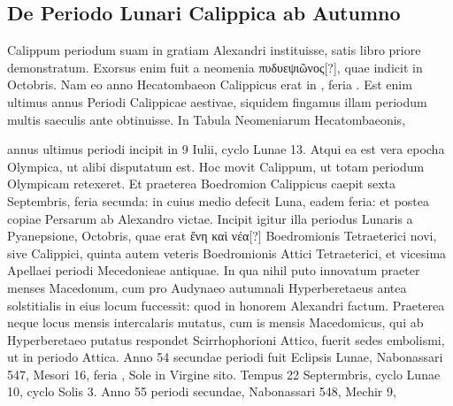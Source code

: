 



\subsection{De Periodo Lunari Calippica ab Autumno}
Calippum periodum suam in gratiam Alexandri instituisse,
satis libro priore demonstratum.
Exorsus enim fuit a neomenia
\textgreek{πυδυεψιῶνος[?]}, quae indicit in  Octobris.
Nam eo anno
Hecatombaeon Calippicus erat in , feria .
Est enim ultimus
annus Periodi Calippicae aestivae, siquidem fingamus illam periodum
multis saeculis ante obtinuisse.
In Tabula Neomeniarum Hecatombaeonis,
\begin{table}[htbp]
\centering

\end{table}
annus ultimus periodi incipit in 9 Iulii, cyclo Lunae 13.
Atqui ea est vera epocha Olympica, ut alibi disputatum est.
Hoc
movit Calippum, ut totam periodum Olympicam retexeret.
Et
praeterea Boedromion Calippicus caepit sexta Septembris, feria secunda:
in cuius medio defecit Luna, eadem feria: et postea copiae
Persarum ab Alexandro victae.
Incipit igitur illa periodus Lunaris
a Pyanepsione,  Octobris, quae erat
 \textgreek{ἔνη καὶ νέα[?]} Boedromionis Tetraeterici
novi, sive Calippici, quinta autem veteris Boedromionis
Attici Tetraeterici, et vicesima Apellaei periodi Mecedonieae antiquae.
In qua nihil puto innovatum praeter menses Macedonum, cum
pro Audynaeo autumnali Hyperberetaeus antea solstitialis in eius
locum fuccessit: quod in honorem Alexandri factum.
Praeterea neque
locus mensis intercalaris mutatus, cum is mensis Macedomicus,
qui ab Hyperberetaeo putatus respondet Scirrhophorioni Attico,
fuerit sedes embolismi, ut in periodo Attica.
Anno 54 secundae periodi
fuit Eclipsis Lunae, Nabonassari 547, Mesori 16, feria , Sole
in Virgine sito.
Tempus 22 Septermbris, cyclo Lunae 10, cyclo
Solis 3.
Anno 55 periodi secundae, Nabonassari 548, Mechir 9,
